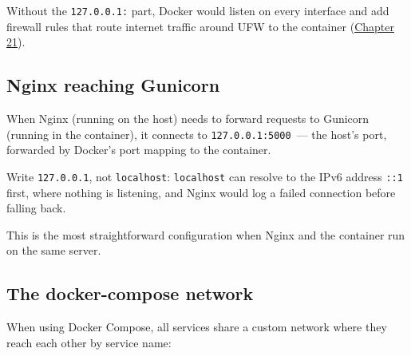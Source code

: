 \noindent{}Without the \texttt{127.0.0.1:} part, Docker would listen on every interface and add firewall rules that route internet traffic around UFW to the container (\hyperref[ch:21-system-setup]{Chapter 21}).

\subsection*{Nginx reaching Gunicorn}\label{22-network-configuration:nginx-reaching-gunicorn}

When Nginx (running on the host) needs to forward requests to Gunicorn (running in the container), it connects to \texttt{127.0.0.1:5000}~--- the host's port, forwarded by Docker's port mapping to the container.

\begin{codebox}[short]

\begin{Shaded}
\begin{Highlighting}[]
\NormalTok{\}}
\end{Highlighting}
\end{Shaded}

\end{codebox}

\noindent{}Write \texttt{127.0.0.1}, not \texttt{localhost}: \texttt{localhost} can resolve to the IPv6 address \texttt{::1} first, where nothing is listening, and Nginx would log a failed connection before falling back.

This is the most straightforward configuration when Nginx and the container run on the same server.

\subsection*{The docker-compose network}\label{22-network-configuration:the-docker-compose-network}

When using Docker Compose, all services share a custom network where they reach each other by service name:

